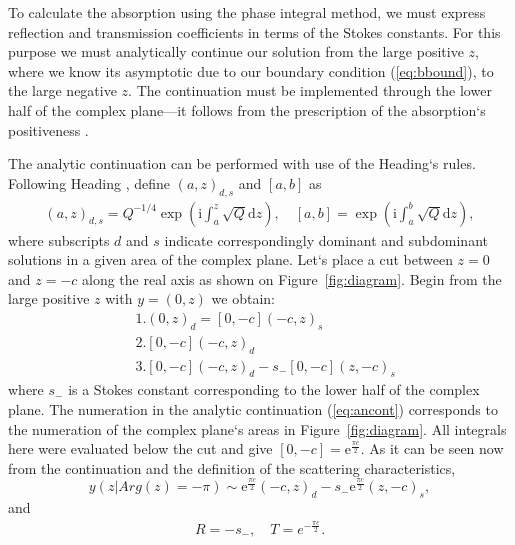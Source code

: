 \documentclass[asy]{iosart2x}
\def\rmi{\mathrm{i}}
\def\rme{\mathrm{e}}
\def\rmd{\mathrm{d}}
\newcommand\eref[1]{(\ref{#1})}
\newcommand\fref[1]{Figure~\ref{#1}}
\begin{document}
To calculate the absorption using the phase integral method, we must express 
reflection and transmission coefficients in terms of the Stokes constants. 
For this purpose we must analytically continue our solution from the large positive $z$,
where we know its asymptotic due to our boundary condition \eref{eq:bbound}, to
the large negative $z$. The continuation must be implemented through the lower half of the
complex plane---it follows from the prescription of the absorption`s positiveness \cite{rwbook}.

The analytic continuation can be performed with use of the Heading`s rules. 
Following Heading \cite{heading}, define $(a,z)_{d,s}$ and $[a,b]$ as
\begin{eqnarray}
(a,z)_{d,s} = Q^{-1/4}\exp \left( \rmi \int_a^z \sqrt{Q} \rmd z \right),
\quad
\left[a,b\right] = \exp \left( \rmi \int_a^b \sqrt{Q} \rmd z \right), 
\end{eqnarray}
where subscripts $d$ and $s$ indicate correspondingly dominant and subdominant solutions 
in a given area of the complex plane. Let`s place a cut between $z=0$ and $z=-c$ 
along the real axis as shown on \fref{fig:diagram}. Begin from the large positive $z$ 
with $y=(0,z)$ we obtain:
\begin{equation}
\begin{split} 
&1.(0,z)_d=[0,-c](-c,z)_s 
\\
&2.[0,-c](-c,z)_d 
\\
&3.[0,-c](-c,z)_d - s_-[0,-c](z,-c)_s
\label{eq:ancont}
\end{split}
\end{equation}
where $s_-$ is a Stokes constant corresponding to the lower half of the complex plane.
The numeration in the analytic continuation \eref{eq:ancont} corresponds to the
numeration of the complex plane`s areas in \fref{fig:diagram}.
All integrals here were evaluated below the cut and give $[0,-c]=\rme^{\frac{\pi c}{2}}$. As it
can be seen now from the continuation and the definition of the scattering characteristics,
\begin{equation}
y(z | Arg(z) = -\pi) \sim \rme^{\frac{\pi c}{2}}(-c,z)_d - s_-\rme^{\frac{\pi c}{2}}(z,-c)_s,
\end{equation}
and
\begin{eqnarray}
R = -s_-, \quad T = e^{-\frac{\pi c}{2}}.
\label{eq:scattr}
\end{eqnarray}
\end{document}

